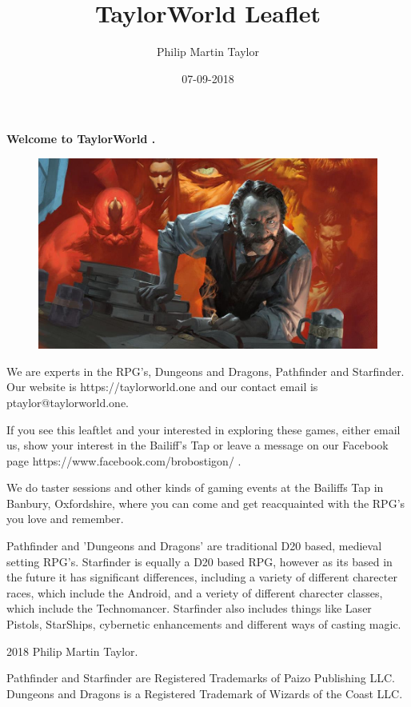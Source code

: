 \documentclass[12pt,a4paper]{book}
\date{07-09-2018}
\author{Philip Martin Taylor}
\title{TaylorWorld Leaflet}
\begin{document}
\begin{center}
\textbf{Welcome to TaylorWorld \texttrademark.}
\end{center}
\begin{figure}[h]
  \centering
  \includegraphics[scale=0.15]{alchemist.jpg}
\end{figure}
\begin{flushleft}
We are experts in the RPG's, Dungeons and Dragons, Pathfinder and Starfinder. Our website is https://taylorworld.one and our contact email is ptaylor@taylorworld.one.
\end{flushleft}
\begin{flushleft}
  If you see this leaftlet and your interested in exploring these games, either email us, show your interest in the Bailiff's Tap or leave a message on our Facebook page https://www.facebook.com/brobostigon/ .
\end{flushleft}
\begin{flushleft}
  We do taster sessions and other kinds of gaming events at the Bailiffs Tap in Banbury, Oxfordshire, where you can come and get reacquainted with the RPG's you love and remember.
\end{flushleft}
\begin{flushleft}
  Pathfinder and 'Dungeons and Dragons' are traditional D20 based, medieval setting RPG's. Starfinder is equally a D20 based RPG, however as its based in the future it has significant differences, including a variety of different charecter races, which include the Android, and a veriety of different charecter classes, which include the Technomancer. Starfinder also includes things like Laser Pistols, StarShips, cybernetic enhancements and different ways of casting magic.
\end{flushleft}
\begin{center}
  \textcopyright{} 2018 Philip Martin Taylor.
\end{center}
\begin{center}
  Pathfinder and Starfinder are Registered Trademarks of Paizo Publishing LLC. Dungeons and Dragons is a Registered Trademark of Wizards of the Coast LLC.
\end{center}
\end{document}
